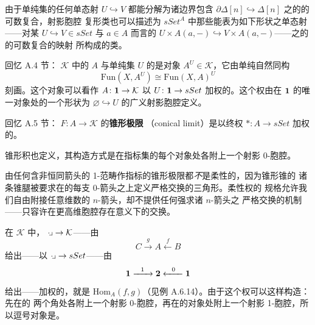 \begin{remark}\label{rem:projective-cell-complexes}
由于单纯集的任何单态射 $U\hookrightarrow V$ 都能分解为诸边界包含
$\partial\Delta[n]\hookrightarrow\Delta[n]$ 之\trCoproduct{}的\trPushout{}的可数复合，射影胞腔
复形类也可以描述为 $sSet^{A}$ 中那些能表为如下形状之单态射——对某
$U\hookrightarrow V\in sSet$ 与 $a\in A$ 而言的
$U\times A(a,-)\hookrightarrow V\times A(a,-)$——之\trCoproduct{}的\trPushout{}的可数复合的映射
所构成的类。
\end{remark}

\begin{example}[余张量是柔性的]\label{exa:cotensors-flexible}
回忆 A.4 节：\trInfinityCosmos{} $\mathcal{K}$ 中的\trInfinityCategory{} $A$
与单纯集 $U$ 的\trCotensor{}是对象 $A^{U}\in\mathcal{K}$，它由单纯自然同构
\[
\mathrm{Fun}(X,A^{U})\cong\mathrm{Fun}(X,A)^{U}
\]
刻画。这个对象可以看作\trDiagram{} $A\colon\mathbf{1}\to\mathcal{K}$ 以
$U\colon\mathbf{1}\to sSet$ 加权的\trLimit。这个权由在 $\mathbf{1}$ 的唯一对象处的一个形状为
$\varnothing\hookrightarrow U$ 的广义射影胞腔定义。
\end{example}

回忆 A.5 节：\trDiagram{} $F\colon A\to\mathcal{K}$ 的\textbf{锥形极限}%
（conical limit）是以终权 $*\colon A\to sSet$ 加权的\trLimit。

\begin{example}[积是柔性的]\label{exa:products-flexible}
锥形积也定义\trFlexibleWeightedLimit{}，其构造方式是在指标集的每个对象处各附上一个射影
0-胞腔。
\end{example}

\begin{nonexample}\label{nex:conical-not-flexible}
由任何含非恒同箭头的 1-范畴作指标的锥形极限都\emph{不}是柔性的，因为锥形锥的
诸条锥腿被要求在\trDiagram{}的每支 0-箭头之上定义严格交换的三角形。柔性权的
规格允许我们自由附接任意维数的 $n$-箭头，却不提供任何强求诸 $n$-箭头之%
\trDiagram{}严格交换的机制——只容许在更高维胞腔存在意义下的交换。
\end{nonexample}

\begin{example}[逗号是柔性的]\label{exa:commas-flexible}
在\trInfinityCosmos{} $\mathcal{K}$ 中，\trDiagram{}
$\cdot\!\lrcorner\to\mathcal{K}$——由\trCospan
\[
C\xrightarrow{\ \ g\ \ }A\xleftarrow{\ \ f\ \ }B
\]
给出——以\trDiagram{} $\cdot\!\lrcorner\to sSet$——由\trCospan
\[
\qcOne\xrightarrow{\ \ 1\ \ }\qcTwo\xleftarrow{\ \ 0\ \ }\qcOne
\]
给出——加权的\trLimit，就是\trCommaInfinityCategory{}
$\mathrm{Hom}_{A}(f,g)$（见例 A.6.14）。由于这个权可以这样构造：先在\trCospan{}的
两个角处各附上一个射影 0-胞腔，再在\trCospan{}的\trTerminal{}对象处附上一个射影
1-胞腔，所以逗号对象是\trFlexibleWeightedLimit{}。
\end{example}

